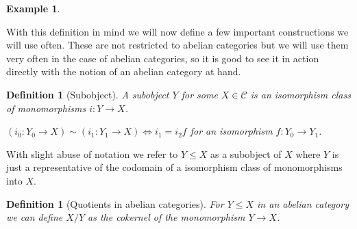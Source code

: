 \documentclass[12pt]{report}
\numberwithin{equation}{section}
\newcommand{\Hom}{{\mathrm{Hom}}}
\newtheorem{definition}[dummy]{Definition}
\newtheorem{example}[dummy]{Example}
\begin{document}
\begin{example}
\begin{enumerate}
		\end{enumerate}
	\end{example}
	

	
	
	
	
	With this definition in mind we will now define a few important constructions we will use often. These are not restricted to abelian categories but we will use them very often in the case of abelian categories, so it is good to see it in action directly with the notion of an abelian category at hand.
	\begin{definition}[Subobject]
		A subobject \( Y \) for some $X \in \mathcal{C}$ is an isomorphism class of monomorphisms $i: Y \to X$. 
		
		\( (i_0:Y_0 \to X) \sim (i_1: Y_1 \to X) \iff i_1=i_2 f \) for an isomorphism \(f:Y_0 \to Y_1 \).
	\end{definition}
	
	
	With slight abuse of notation we refer to $Y \leq X$ as a subobject of $X$ where $Y$ is just a representative of the codomain of a isomorphism class of monomorphisms into $X$. 
	
	
	\begin{definition}[Quotients in abelian categories]
		For $Y \leq X$ in an abelian category we can define $X/Y $ as the cokernel of the monomorphism $Y \to X$. 
	\end{definition}
	
\end{document}
